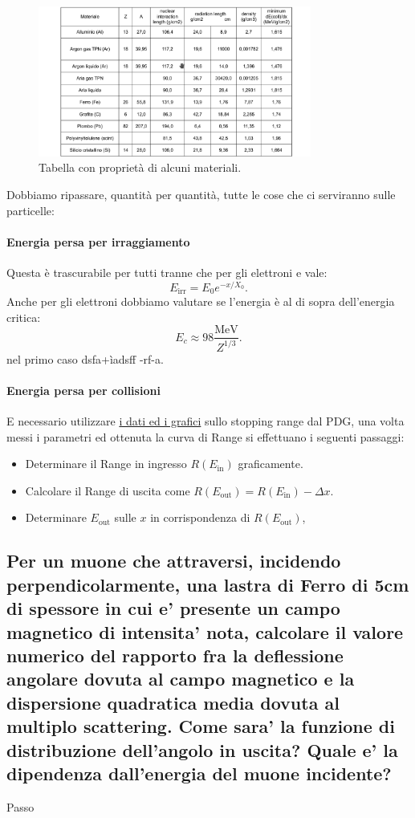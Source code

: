 \begin{figure}[H]
	\centering
	\includegraphics[width=0.8\textwidth]{immagini/materials.png}
	\caption{Tabella con proprietà di alcuni materiali.}
	\label{fig:}
\end{figure}

Dobbiamo ripassare, quantità per quantità, tutte le cose che ci serviranno sulle particelle:

\paragraph{Energia persa per irraggiamento}%
Questa è trascurabile per tutti tranne che per gli elettroni e vale:
\[
	E_{\text{irr}}= E_0 e^{- x /X_0}
.\] 
Anche per gli elettroni dobbiamo valutare se l'energia è al di sopra dell'energia critica:
\[
	E_{c} \approx 98 \frac{\text{MeV}}{Z^{1 /3}}
.\] 
nel primo caso dsfa+ìadsff
 -rf-a.

\paragraph{Energia persa per collisioni}%
E necessario utilizzare \href{https://www.nist.gov/pml/stopping-power-range-tables-electrons-protons-and-helium-ions}{i dati ed i grafici} sullo stopping range dal PDG, una volta messi i parametri ed ottenuta la curva di Range si effettuano i seguenti passaggi:
\begin{itemize}
	\item Determinare il Range in ingresso $R\left( E_{\text{in}}\right)$ graficamente.
	\item Calcolare il Range di uscita come $R\left( E_{\text{out}} \right)= R\left( E_{\text{in}} \right) - \Delta x$.
	\item Determinare $E_{\text{out}}$ sulle $x$ in corrispondenza di $R\left( E_{\text{out}} \right)$,
\end{itemize}


\subsection[]{Per un muone che attraversi, incidendo perpendicolarmente, una lastra di Ferro di 5cm di spessore in cui e' presente un campo magnetico di intensita' nota, calcolare il valore numerico del rapporto fra la deflessione angolare dovuta al campo magnetico e la dispersione quadratica media dovuta al multiplo scattering. Come sara’ la funzione di distribuzione dell’angolo in uscita? Quale e’ la dipendenza dall’energia del muone incidente?
}
\label{sec:4.b.20}
Passo

